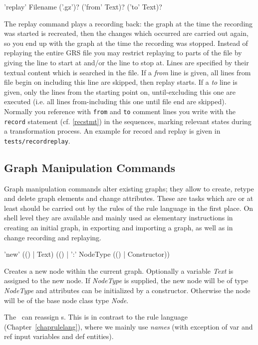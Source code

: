 \begin{rail}
  'replay' Filename ('.gz')? ('from' Text)? ('to' Text)?
\end{rail}
The replay command plays a recording back: the graph at the time the recording was started is recreated, then the changes which occurred are carried out again, so you end up with the graph at the time the recording was stopped. Instead of replaying the entire GRS file you may restrict replaying to parts of the file by giving the line to start at and/or the line to stop at. Lines are specified by their textual content which is searched in the file.
If a \emph{from} line is given, all lines from file begin on including this line are skipped, then replay starts. If a \emph{to} line is given, only the lines from the starting point on, until-excluding this one are executed (i.e. all lines from-including this one until file end are skipped).
Normally you reference with \texttt{from} and \texttt{to} comment lines you write with the \texttt{record} statement (cf. \ref{recstmt}) in the sequences, marking relevant states during a transformation process.
An example for record and replay is given in \texttt{tests/recordreplay}.

\subsection{Graph Manipulation Commands}
\label{mani}
Graph manipulation commands alter existing graphs;
they allow to create, retype and delete graph elements and change attributes.
These are tasks which are or at least should be carried out by the rules of the rule language in the first place.
On shell level they are available and mainly used as elementary instructions in creating an initial graph, in exporting and importing a graph, as well as in change recording and replaying.

\begin{rail}
  'new' (() | Text) (() | ':' NodeType (() | Constructor))
\end{rail}
Creates a new node within the current graph.
Optionally a variable \emph{Text} is assigned to the new node.
If \emph{NodeType} is supplied, the new node will be of type \emph{NodeType} and attributes can be initialized by a constructor.
Otherwise the node will be of the base node class type \emph{Node}.
\begin{note}
The \GrShell\ can reassign s.
This is in contrast to the rule language (Chapter~\ref{chaprulelang}), where we mainly use \emph{names}
(with exception of var and ref input variables and def entities).
\end{note}

